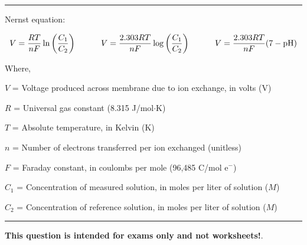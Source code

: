 \vskip 5pt
\hrule
\vskip 5pt

\noindent
Nernst equation:

$$V = {{R T} \over {nF}} \ln \left({C_1 \over C_2}\right) \hskip 30pt V = {{2.303 R T} \over {nF}} \log \left({C_1 \over C_2}\right) \hskip 30pt V = {{2.303 R T} \over {nF}} (7 - \hbox{pH})$$

\noindent
Where,

$V$ = Voltage produced across membrane due to ion exchange, in volts (V)

$R$ = Universal gas constant (8.315 J/mol$\cdot$K)

$T$ = Absolute temperature, in Kelvin (K)

$n$ = Number of electrons transferred per ion exchanged (unitless)

$F$ = Faraday constant, in coulombs per mole (96,485 C/mol e$^{-}$)

$C_1$ = Concentration of measured solution, in moles per liter of solution ($M$)

$C_2$ = Concentration of reference solution, in moles per liter of solution ($M$)

\vskip 5pt
\hrule
\vskip 5pt















{\bf This question is intended for exams only and not worksheets!}.



